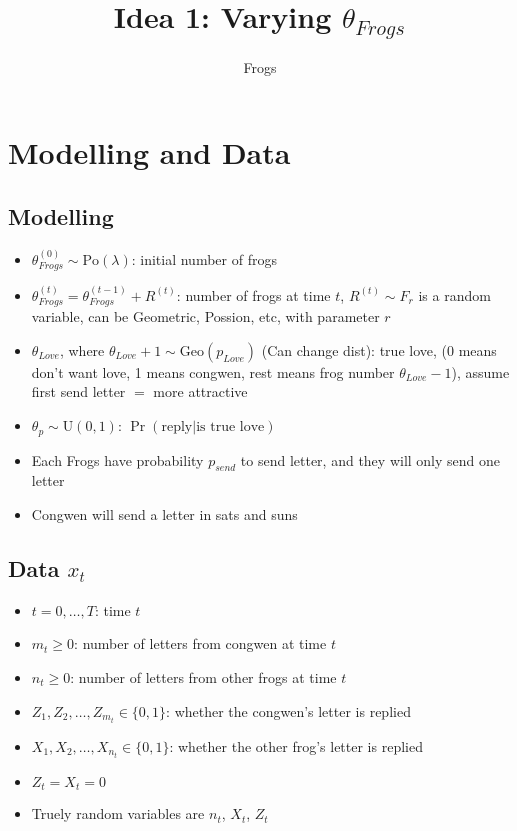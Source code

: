 \documentclass[10pt, a4paper]{article}
\title{Idea 1: Varying $\theta_{Frogs}$}
\author{Frogs}
\begin{document}
    \maketitle

    \section{Modelling and Data}

    \subsection{Modelling}
    \begin{itemize}
        \item $\theta_{Frogs}^{(0)} \sim \mathrm{Po}(\lambda)$: initial number of frogs
        \item $\theta_{Frogs}^{(t)} = \theta_{Frogs}^{(t-1)} + R^{(t)}$: number of frogs at time $t$, $R^{(t)} \sim F_{r}$ is a random variable, can be Geometric, Possion, etc, with parameter $r$
        \item $\theta_{Love}$, where $\theta_{Love}+1 \sim \mathrm{Geo}(p_{Love})$ (Can change dist): true love, (0 means don't want love, 1 means congwen, rest means frog number $\theta_{Love}-1$), assume first send letter $=$ more attractive
        \item $\theta_p \sim \mathrm{U}(0,1)$: $\Pr(\text{reply}|\text{is true love})$
        \item Each Frogs have probability $p_{send}$ to send letter, and they will only send one letter
        \item Congwen will send a letter in sats and suns
    \end{itemize}

    \subsection{Data $x_t$}
    \begin{itemize}
        \item $t = 0, \ldots, T$: time $t$
        \item $m_t \geq 0$: number of letters from congwen at time $t$
        \item $n_t \geq 0$: number of letters from other frogs at time $t$
        \item $Z_1, Z_2, \ldots, Z_{m_t} \in \{0,1\}$: whether the congwen's letter is replied 
        \item $X_1, X_2, \ldots, X_{n_t} \in \{0,1\}$: whether the other frog's letter is replied
        \item $Z_t = X_t = 0$
        \item Truely random variables are $n_t$, $X_t$, $Z_t$
    \end{itemize}
\end{document}
